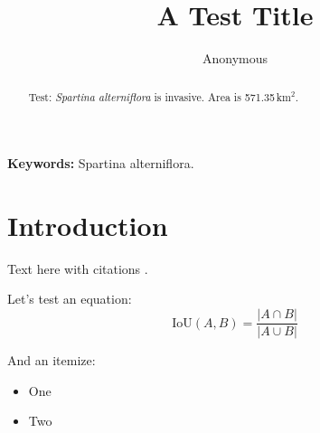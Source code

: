\documentclass[11pt]{article}
\title{A Test Title}
\author{Anonymous}
\date{}
\begin{document}
\maketitle

\begin{abstract}
Test: \textit{Spartina alterniflora} is invasive. Area is 571.35\,km$^2$.
\end{abstract}

\textbf{Keywords:} Spartina alterniflora.

\section{Introduction}
Text here with citations \citep{an_1985_spartina, xu_2025_cmssm}.

Let's test an equation:
\begin{equation}
\text{IoU}(A, B) = \frac{|A \cap B|}{|A \cup B|}
\end{equation}

And an itemize:
\begin{itemize}[nosep]
\item One
\item Two
\end{itemize}



\end{document}
